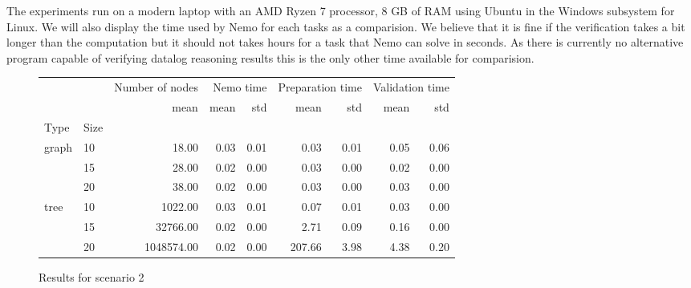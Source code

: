 The experiments run on a modern laptop with an AMD Ryzen 7 processor, 8 GB of RAM using Ubuntu in the Windows subsystem for Linux. We will also display the time used by Nemo for each tasks as a comparision. We believe that it is fine if the verification takes a bit longer than the computation but it should not takes hours for a task that Nemo can solve in seconds. As there is currently no alternative program capable of verifying datalog reasoning results this is the only other time available for comparision.

\begin{figure}
\begin{tabular}{llrrrrrrr}
    &  & Number of nodes & \multicolumn{2}{r}{Nemo time} & \multicolumn{2}{r}{Preparation time} & \multicolumn{2}{r}{Validation time} \\
    &  & mean & mean & std & mean & std & mean & std \\
   Type & Size &  &  &  &  &  &  &  \\
   \multirow[c]{3}{*}{graph} & 10 & 18.00 & 0.03 & 0.01 & 0.03 & 0.01 & 0.05 & 0.06 \\
    & 15 & 28.00 & 0.02 & 0.00 & 0.03 & 0.00 & 0.02 & 0.00 \\
    & 20 & 38.00 & 0.02 & 0.00 & 0.03 & 0.00 & 0.03 & 0.00 \\
   \multirow[c]{3}{*}{tree} & 10 & 1022.00 & 0.03 & 0.01 & 0.07 & 0.01 & 0.03 & 0.00 \\
    & 15 & 32766.00 & 0.02 & 0.00 & 2.71 & 0.09 & 0.16 & 0.00 \\
    & 20 & 1048574.00 & 0.02 & 0.00 & 207.66 & 3.98 & 4.38 & 0.20 \\
\end{tabular}
\caption{Results for scenario 2}
\end{figure}
